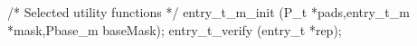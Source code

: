 \begin{code}
/* Selected utility functions */
 entry\_t\_m\_init (P\_t *pads,entry\_t\_m *mask,Pbase\_m baseMask);
 entry\_t\_verify (entry\_t *rep);
\end{code}
